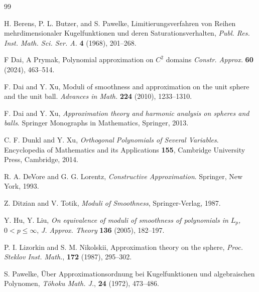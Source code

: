 \documentclass{amsart}
\theoremstyle{remark}
\begin{document}
\begin{thebibliography}{99}

         H. Berens, P. L. Butzer, and S. Pawelke,
         Limitierungsverfahren von Reihen mehrdimensionaler Kugelfunktionen
         und deren Saturationsverhalten,
         \textit{Publ. Res. Inst. Math. Sci. Ser. A.} \textbf{4} (1968),
         201--268.

         F Dai, A Prymak, 
         Polynomial approximation on $C^2$ domains
         \textit{Constr. Approx.} \textbf{60} (2024), 463--514.

         
        F. Dai and Y. Xu,
        Moduli of smoothness and approximation on the unit sphere and the unit ball.
        \textit{Advances in Math.} \textbf{224} (2010), 1233--1310.
          
        F. Dai and Y. Xu,
        \textit{Approximation theory and harmonic analysis on spheres and balls}.
        Springer Monographs in Mathematics, Springer, 2013. 

         C. F. Dunkl and Y. Xu, 
         \textit{Orthogonal Polynomials of Several Variables}. Encyclopedia of Mathematics and its Applications 
         \textbf{155}, Cambridge University Press, Cambridge, 2014.      
        
        R. A. DeVore and G. G. Lorentz,
        \textit{Constructive Approximation}.
        Springer, New York, 1993.
        
          Z. Ditzian  and V. Totik,
          \textit{Moduli of Smoothness},
           Springer-Verlag, 1987.        

           Y. Hu, Y. Liu, 
          \textit{On equivalence of moduli of smoothness of polynomials in $L_p$, $0 < p\leq  \infty$}, 
          \textit{J. Approx. Theory} \textbf{136} (2005), 182--197.

          P. I. Lizorkin and S. M. Nikolskii,
          Approximation theory on the sphere,
          \textit{Proc. Steklov Inst. Math.}, \textbf{172} (1987),
          295--302.

         S. Pawelke,
         \"Uber Approximationsordnung bei Kugelfunktionen und algebraischen
         Polynomen,
         \textit{T\^ohoku Math. J.}, \textbf{24} (1972), 473--486.


\end{thebibliography}
\end{document}
